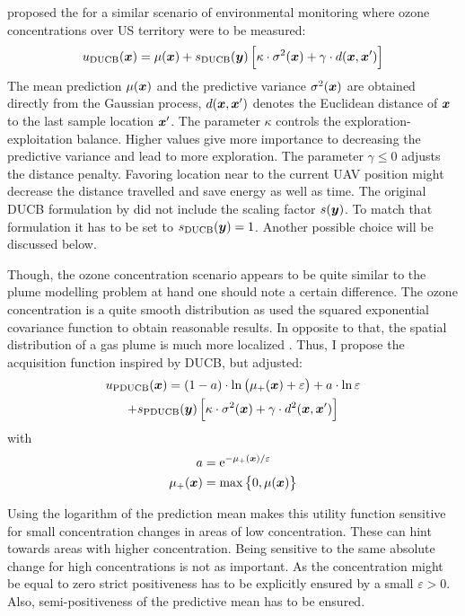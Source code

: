 \Textcite{Marchant:2012wb} proposed the  for a similar scenario of environmental monitoring 
    where ozone concentrations over US territory were to be measured:
\begin{equation}
    u\ped{DUCB}(\vc x) = \mu(\vc x) + s\ped{DUCB}(\vc y) \sbr{\kappa \cdot 
        \sigma^2(\vc x) + \gamma \cdot d(\vc x, \vc x')}
\end{equation}
The mean prediction $\mu(\bm{x})$ and the predictive variance $\sigma^2(\bm{x})$ 
are obtained directly from the Gaussian process, $d(\bm{x}, \bm{x}')$ denotes the 
Euclidean distance of $\bm{x}$ to the last sample location $\bm{x}'$. The 
parameter $\kappa$ controls the exploration-exploitation balance. Higher values 
give more importance to decreasing the predictive variance and lead to more 
exploration. The parameter $\gamma \leq 0$ adjusts the distance penalty.  
Favoring location near to the current UAV position might decrease the distance 
travelled and save energy as well as time. The original DUCB formulation by 
\textcite{Marchant:2012wb} did not include the scaling factor $s(\bm{y})$. To 
match that formulation it has to be set to $s_{\mathrm{DUCB}}(\bm{y}) = 1$. Another 
possible choice will be discussed below.

Though, the ozone concentration scenario appears to be quite similar to the 
plume modelling problem at hand one should note a certain difference. The ozone 
concentration is a quite smooth distribution as \textcite{Marchant:2012wb} used 
the squared exponential covariance function to obtain reasonable results. In 
opposite to that, the spatial distribution of a gas plume is much more localized 
\parencite[this was also noted by][]{Stachniss:2008vz}. Thus, I propose the 
 acquisition 
    function inspired by DUCB, but adjusted:
\begin{multline}
    u\ped{PDUCB}(\vc x) = \del{1 - a} \cdot \ln\del{\mu_+(\vc x) + \varepsilon} 
    + a \cdot \ln \varepsilon \\ + s\ped{PDUCB}(\vc y) \sbr{\kappa \cdot 
        \sigma^2(\vc x) + \gamma \cdot d^2(\vc x, \vc x')}
\end{multline}
with
\begin{align}
    a &= \e^{-\mu_+(\vc x) / \varepsilon} \\
    \mu_+(\vc x) &= \max\cbr{0, \mu(\vc x)}
\end{align}

Using the logarithm of the prediction mean makes this utility function sensitive 
for small concentration changes in areas of low concentration. These can hint 
towards areas with higher concentration.  Being sensitive to the same absolute 
change for high concentrations is not as important. As the concentration might 
be equal to zero strict positiveness has to be explicitly ensured by a small 
$\varepsilon > 0$.  Also, semi-positiveness of the predictive mean has to be 
ensured.

